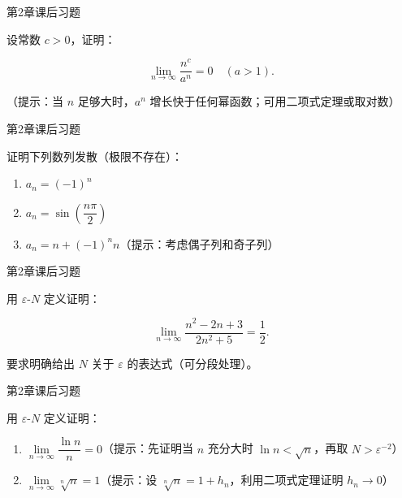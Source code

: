\documentclass[aspectratio=169,10pt,fontset=fandol]{ctexbeamer}
\begin{document}
\begin{frame}[t,fragile]{第2章课后习题}
\normalsize
{\normalsize
设常数 \(c > 0\)，证明：

\[

\lim\limits_{n \to \infty} \dfrac{n^c}{a^n} = 0 \quad (a > 1).

\]

（提示：当 \(n\) 足够大时，\(a^n\) 增长快于任何幂函数；可用二项式定理或取对数）


}
\end{frame}
\begin{frame}[t,fragile]{第2章课后习题}
\normalsize
{\normalsize
证明下列数列发散（极限不存在）：

\begin{enumerate}

\item \(a_n = (-1)^n\)

\item \(a_n = \sin\left(\dfrac{n\pi}{2}\right)\)

\item \(a_n = n + (-1)^n n\)（提示：考虑偶子列和奇子列）

\end{enumerate}


}
\end{frame}
\begin{frame}[t,fragile]{第2章课后习题}
\normalsize
{\normalsize
用 \(\varepsilon\)-\(N\) 定义证明：

\[

\lim_{n\to\infty} \dfrac{n^2 - 2n + 3}{2n^2 + 5} = \dfrac{1}{2}.

\]

要求明确给出 \(N\) 关于 \(\varepsilon\) 的表达式（可分段处理）。


}
\end{frame}
\begin{frame}[t,fragile]{第2章课后习题}
\normalsize
{\normalsize
用 \(\varepsilon\)-\(N\) 定义证明：

\begin{enumerate}

\item \(\lim\limits_{n\to\infty} \dfrac{\ln n}{n} = 0\)（提示：先证明当 \(n\) 充分大时 \(\ln n<\sqrt n\)，再取 \(N>\varepsilon^{-2}\)）

\item \(\lim\limits_{n\to\infty} \sqrt[n]{n} = 1\)（提示：设 \(\sqrt[n]{n} = 1 + h_n\)，利用二项式定理证明 \(h_n \to 0\)）

\end{enumerate}


}
\end{frame}
\end{document}
